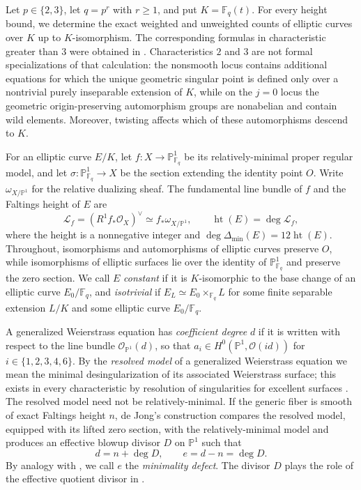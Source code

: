 \documentclass[a4paper,12pt]{amsart}
\theoremstyle{definition}
\newcommand{\Fb}{\mathbb{F}}
\DeclareMathOperator{\height}{ht}
\newcommand{\Pb}{\mathbb{P}}
\begin{document}
Let $p\in\{2,3\}$, let $q=p^r$ with $r\geq1$, and put $K=\Fb_q(t)$.  For every height bound, we determine the exact weighted and unweighted counts of elliptic curves over $K$ up to $K$-isomorphism.  The corresponding formulas in characteristic greater than $3$ were obtained in \cite[Theorem~9.7]{BPS}.  Characteristics $2$ and $3$ are not formal specializations of that calculation: the nonsmooth locus contains additional equations for which the unique geometric singular point is defined only over a nontrivial purely inseparable extension of $K$, while on the $j=0$ locus the geometric origin-preserving automorphism groups are nonabelian and contain wild elements.  Moreover, twisting affects which of these automorphisms descend to $K$.

\medskip

For an elliptic curve $E/K$, let $f\colon X\to\Pb^1_{\Fb_q}$ be its relatively-minimal proper regular model, and let $\sigma\colon\Pb^1_{\Fb_q}\to X$ be the section extending the identity point $O$.  Write $\omega_{X/\Pb^1}$ for the relative dualizing sheaf.  The fundamental line bundle of $f$ and the Faltings height of $E$ are
\[
\mathcal L_f=(R^1f_*\mathcal O_X)^\vee\simeq f_*\omega_{X/\Pb^1},
\qquad
\height(E)=\deg\mathcal L_f,
\]
where the height is a nonnegative integer and $\deg\Delta_{\min}(E)=12\height(E)$.  Throughout, isomorphisms and automorphisms of elliptic curves preserve $O$, while isomorphisms of elliptic surfaces lie over the identity of $\Pb^1_{\Fb_q}$ and preserve the zero section.  We call $E$ \emph{constant} if it is $K$-isomorphic to the base change of an elliptic curve $E_0/\Fb_q$, and \emph{isotrivial} if $E_L\simeq E_0\times_{\Fb_q}L$ for some finite separable extension $L/K$ and some elliptic curve $E_0/\Fb_q$.

\medskip

A generalized Weierstrass equation has \emph{coefficient degree} $d$ if it is written with respect to the line bundle $\mathcal O_{\Pb^1}(d)$, so that $a_i\in H^0(\Pb^1,\mathcal O(id))$ for $i\in\{1,2,3,4,6\}$.  By the \emph{resolved model} of a generalized Weierstrass equation we mean the minimal desingularization of its associated Weierstrass surface; this exists in every characteristic by resolution of singularities for excellent surfaces \cite{Lipman}.  The resolved model need not be relatively-minimal.  If the generic fiber is smooth of exact Faltings height $n$, de Jong's construction compares the resolved model, equipped with its lifted zero section, with the relatively-minimal model and produces an effective blowup divisor $D$ on $\Pb^1$ such that
\[
d=n+\deg D,
\qquad
e=d-n=\deg D.
\]
By analogy with \cite[Definition~4.31]{BPS}, we call $e$ the \emph{minimality defect}.  The divisor $D$ plays the role of the effective quotient divisor in \cite[Lemma~4.32]{BPS}.
\end{document}
